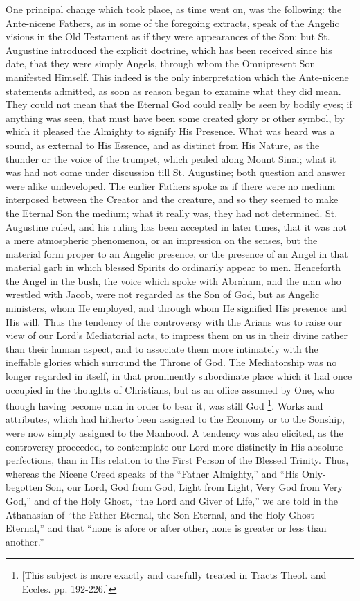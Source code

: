 One principal change which took place, as time went
on, was the following: the Ante-nicene Fathers, as in
some of the foregoing extracts, speak of the Angelic
visions in the Old Testament as if they were appearances
of the Son; but St. Augustine introduced the explicit
doctrine, which has been received since his date, that
they were simply Angels, through whom the Omnipresent Son
manifested Himself. This indeed is the only
interpretation which the Ante-nicene statements admitted,
as soon as reason began to examine what they did mean.
They could not mean that the Eternal God could really be
seen by bodily eyes; if anything was seen, that must have
been some created glory or other symbol, by which it
pleased the Almighty to signify His Presence. What was
heard was a sound, as external to His Essence, and as
distinct from His Nature, as the thunder or the voice of
the trumpet, which pealed along Mount Sinai; what it was
had not come under discussion till St. Augustine; both
question and answer were alike undeveloped. The earlier
Fathers spoke as if there were no medium interposed
between the Creator and the creature, and so they seemed
to make the Eternal Son the medium; what it really was,
they had not determined. St. Augustine ruled, and his
ruling has been accepted in later times, that it was not
a mere atmospheric phenomenon, or an impression on the
senses, but the material form proper to an Angelic
presence, or the presence of an Angel in that material
garb in which blessed Spirits do ordinarily appear to
men. Henceforth the Angel in the bush, the voice which
spoke with Abraham, and the man who wrestled with Jacob,
were not regarded as the Son of God, but as Angelic
ministers, whom He employed, and through whom He
signified His presence and His will. Thus the tendency of
the controversy with the Arians was to raise our view of
our Lord's Mediatorial acts, to impress them on us in
their divine rather than their human aspect, and to
associate them more intimately with the ineffable glories
which surround the Throne of God. The Mediatorship was no
longer regarded in itself, in that prominently
subordinate place which it had once occupied in the
thoughts of Christians, but as an office assumed by One,
who though having become man in order to bear it, was
still God \footnote{[This subject is more exactly
and carefully treated in Tracts Theol. and
Eccles. pp. 192-226.]}. Works and attributes, which had hitherto been
assigned to the Economy or to the Sonship, were now
simply assigned to the Manhood. A tendency was also
elicited, as the controversy proceeded, to contemplate
our Lord more distinctly in His absolute perfections,
than in His relation to the First Person of the Blessed
Trinity. Thus, whereas the Nicene Creed speaks of the
``Father Almighty,'' and ``His Only-begotten
Son, our Lord, God from God, Light from Light, Very God
from Very God,'' and of the Holy Ghost, ``the
Lord and Giver of Life,'' we are told in the
Athanasian of ``the Father Eternal, the Son Eternal,
and the Holy Ghost Eternal,'' and that ``none is
afore or after other, none is greater or less than
another.''

